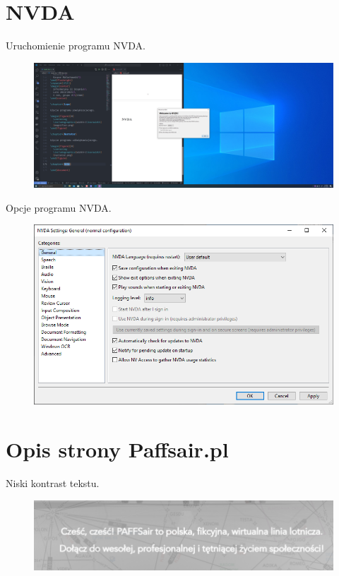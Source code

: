 \documentclass[12pt,oneside,a4paper]{book} %
\theoremstyle{break}
\begin{document}
\chapter*{NVDA}

Uruchomienie programu NVDA.

\begin{figure}[H]
  \centering
  \includegraphics[width=1\textwidth]{nvda.png}
\end{figure}

Opcje programu NVDA.

\begin{figure}[H]
  \centering
  \includegraphics[width=1\textwidth]{nvda-settings.png}
\end{figure}

\chapter*{Opis strony Paffsair.pl}

Niski kontrast tekstu.
\begin{figure}[H]
  \centering
  \includegraphics[width=1\textwidth]{paffsair/low-contrast.png}
\end{figure}
\end{document}

